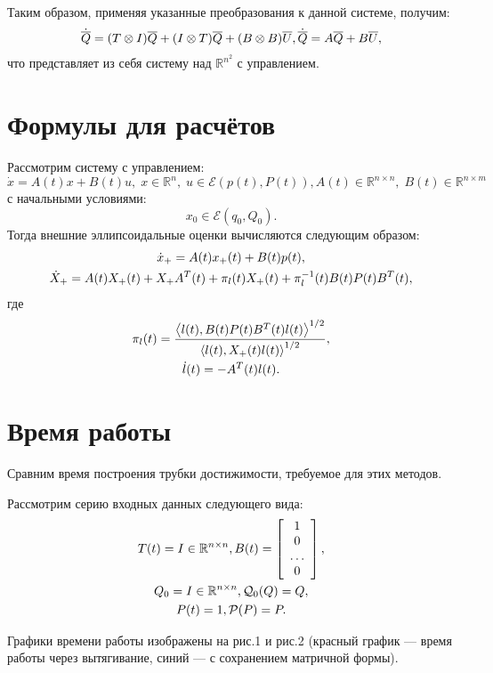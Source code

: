 \documentclass[12pt]{article}
\theoremstyle{rusdef}
\newcommand{\scalar}[2]{\left<#1,#2\right>}
\newcommand{\R}{\ensuremath{\mathbb{R}}} %
\newcommand{\E}{\ensuremath{\mathcal{E}}} %
\begin{document}
Таким образом, применяя указанные преобразования к данной системе, получим:
\begin{gather}
\dot{\overline{Q}} = (T \otimes I)\overline{Q} + (I \otimes T)\overline{Q} + (B \otimes B)\overline{U}, \notag
\dot{\overline{Q}} = A\overline{Q} + B\overline{U}, \notag
\end{gather}
что представляет из себя систему над $\R^{n^2}$ с управлением.

\section{Формулы для расчётов}
Рассмотрим систему с управлением:
$$
\dot{x} = A(t)x + B(t)u, \; x \in \R^n, \; u \in \E(p(t), P(t)), A(t) \in \R^{n \times n}, \; B(t) \in \R^{n \times m}
$$
с начальными условиями:
$$
x_0 \in \E(q_0, Q_0).
$$
Тогда внешние эллипсоидальные оценки вычисляются следующим образом:
\begin{gather}
\dot{x}_+ = A(t)x_+(t) + B(t)p(t), \notag \\
\dot{X}_+ = A(t)X_+(t) + X_+A^T(t) + \pi_l(t)X_+(t) + \pi_l^{-1}(t) B(t)P(t)B^T(t), \notag
\end{gather}
где
\begin{gather}
\pi_l(t) = \frac{\scalar{l(t)}{B(t)P(t)B^T(t)l(t)}^{1/2}}{\scalar{l(t)}{X_+(t)l(t)}^{1/2}}, \notag \\
\dot{l}(t) = -A^T(t) l(t). \notag
\end{gather}

\section{Время работы}
Сравним время построения трубки достижимости, требуемое для этих методов.

Рассмотрим серию входных данных следующего вида:
\begin{gather}
T(t) = I \in \R^{n \times n},
B(t) = \left[
\begin{array}{cccc}
1 \\
0 \\
\ldots \\
0
\end{array}
\right], \notag \\
Q_0 = I \in \R^{n \times n},
\mathcal{Q}_0(Q) = Q, \notag \\
P(t) = 1,
\mathcal{P}(P) = P. \notag
\end{gather}

Графики времени работы изображены на рис.1 и рис.2 (красный график --- время работы через вытягивание, синий --- с сохранением матричной формы).
\end{document}
